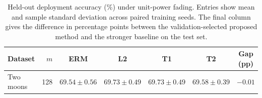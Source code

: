 \begin{table}[htb]
\centering
\caption{Held-out deployment accuracy (\%) under unit-power fading. Entries show mean and sample standard deviation across paired training seeds. The final column gives the difference in percentage points between the validation-selected proposed method and the stronger baseline on the test set.}
\label{tab:unit-power-sweep}
\begin{tabular}{lrccccc}
\toprule
Dataset & $m$ & ERM & L2 & T1 & T2 & Gap (pp) \\
\midrule
Two moons & 128 & $69.54\pm0.56$ & $\mathbf{69.73}\pm0.49$ & $69.73\pm0.49$ & $69.58\pm0.39$ & $-0.01$ \\
\bottomrule
\end{tabular}
\end{table}
